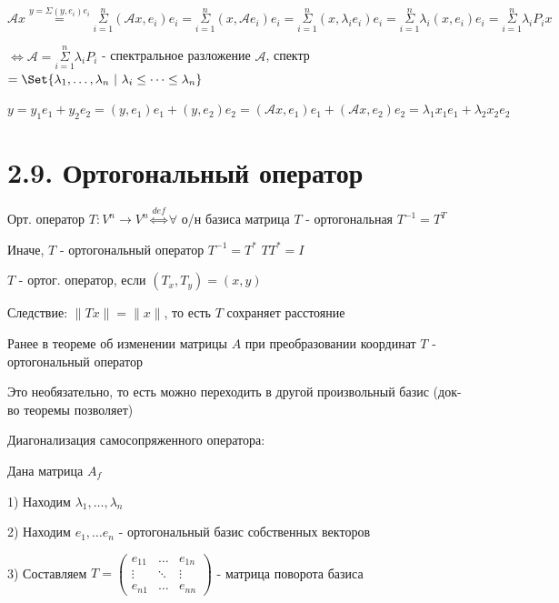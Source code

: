 \documentclass[12pt]{article}
\begin{document}
    $\mathcal{A} x \stackrel{y = \Sigma (y, e_i) e_i}{=} \overset{n}{\underset{i = 1}{\Sigma}} (\mathcal{A}x, e_i) e_i =
    \overset{n}{\underset{i = 1}{\Sigma}} (x, \mathcal{A}e_i) e_i = \overset{n}{\underset{i = 1}{\Sigma}} (x, \lambda_i e_i) e_i =
    \overset{n}{\underset{i = 1}{\Sigma}} \lambda_i (x, e_i) e_i = \overset{n}{\underset{i = 1}{\Sigma}} \lambda_i P_i x$

    $\Longleftrightarrow \mathcal{A} = \overset{n}{\underset{i = 1}{\Sigma}} \lambda_i P_i$ - спектральное разложение $\mathcal{A}$,
    спектр $= \Set{\lambda_1, \dots, \lambda_n \ | \ \lambda_i \leq \dots \leq \lambda_n}$

    \Ex

    $y = y_1 e_1 + y_2 e_2 = (y, e_1) e_1 + (y, e_2) e_2 = (\mathcal{A}x, e_1) e_1 + (\mathcal{A}x, e_2) e_2 = \lambda_1 x_1 e_1 + \lambda_2 x_2 e_2$

    \section{2.9. Ортогональный оператор}

    \Mem Орт. оператор $T: V^n \to V^n \overset{def}{\Longleftrightarrow} \forall$ о/н базиса матрица $T$ - ортогональная $T^{-1} = T^T$

    \Nota Иначе, $T$ - ортогональный оператор \Longleftrightarrow $T^{-1} = T^*$ \Longrightarrow $T T^* = I$

    \Def $T$ - ортог. оператор, если $(T_x, T_y) = (x, y)$

    Следствие: $\|Tx\| = \|x\|$, то есть $T$ сохраняет расстояние

    \Nota Ранее в теореме об изменении матрицы $A$ при преобразовании координат $T$ - ортогональный оператор

    Это необязательно, то есть можно переходить в другой произвольный базис (док-во теоремы позволяет)

    Диагонализация самосопряженного оператора:

    Дана матрица $A_f$

    1) Находим $\lambda_1, \dots, \lambda_n$

    2) Находим $e_1, \dots e_n$ - ортогональный базис собственных векторов

    3) Составляем $T = \begin{pmatrix}e_{11} & \dots & e_{1n} \\ \vdots & \ddots & \vdots \\ e_{n1} & \dots & e_{nn}\end{pmatrix}$ - матрица поворота базиса
\end{document}
